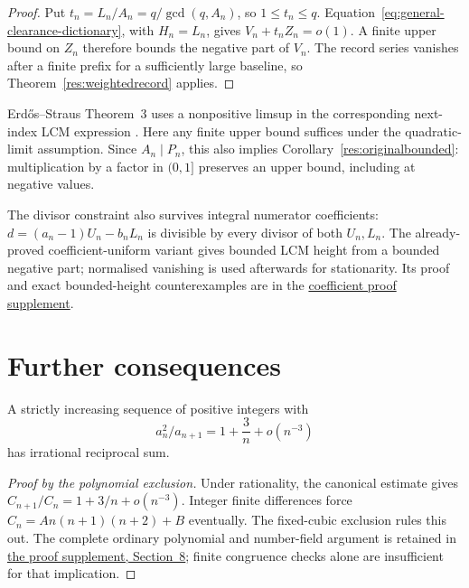 \documentclass[11pt]{article}
\begin{document}
\begin{proof}
Put $t_n=L_n/A_n=q/\gcd(q,A_n)$, so $1\le t_n\le q$.
Equation~\eqref{eq:general-clearance-dictionary}, with $H_n=L_n$, gives
$V_n+t_nZ_n=o(1)$. A finite upper bound on $Z_n$ therefore bounds the
negative part of $V_n$. The record series vanishes after a finite prefix
for a sufficiently large baseline, so Theorem~\ref{res:weightedrecord}
applies.
\end{proof}

Erd\H{o}s--Straus Theorem~3 uses a nonpositive limsup in the corresponding
next-index LCM expression \cite[Theorem~3, p.~132]{erdosstraus1964}. Here any finite upper
bound suffices under the quadratic-limit assumption. Since $A_n\mid P_n$,
this also implies Corollary~\ref{res:originalbounded}: multiplication by
a factor in $(0,1]$ preserves an upper bound, including at negative values.

The divisor constraint also survives integral numerator coefficients:
$d=(a_n-1)U_n-b_nL_n$ is divisible by every divisor of both $U_n,L_n$.
The already-proved coefficient-uniform variant gives bounded LCM height
from a bounded negative part; normalised vanishing is used afterwards for
stationarity. Its proof and exact bounded-height counterexamples are in the
\href{\repobase/\PX/Erdos243/CoefficientUniformBoundedHeight.md}
{coefficient proof supplement}.

\section{Further consequences}\label{sec:secondaryrate}
\begin{theorem}\label{res:cubicrate}
A strictly increasing sequence of positive integers with
\[
 a_n^2/a_{n+1}=1+\frac3n+o(n^{-3})
\]
has irrational reciprocal sum.
\end{theorem}
\begin{proof}[Proof by the polynomial exclusion]
Under rationality, the canonical estimate gives
$C_{n+1}/C_n=1+3/n+o(n^{-3})$. Integer finite differences force
$C_n=An(n+1)(n+2)+B$ eventually. The fixed-cubic exclusion rules this out.
The complete ordinary polynomial and number-field argument is retained in
\href{\repobase/\PX/Erdos243/WeightedRecordOctupleCriteria.md\#8-rising-factorial-cubic-profiles-and-the-cubic-rate-irrationality-r08}
{the proof supplement, Section~8}; finite congruence checks alone are
insufficient for that implication.
\end{proof}
\end{document}
